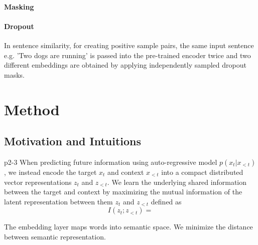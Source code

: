 \documentclass[a4paper]{article}
\begin{document}
	\paragraph*{Masking}
	\paragraph*{Dropout} \cite{gao2021simcse} In sentence similarity, for creating positive sample pairs, the same input sentence e.g. 'Two dogs are running' is passed into the pre-trained encoder twice and two different embeddings are obtained by applying independently sampled dropout masks.  

	\section{Method}

	\subsection{Motivation and Intuitions}

	\cite{van2018representation}p2-3
	When predicting future information using auto-regressive model $p(x_t|x_{<t})$, we instead encode the target $x_t$ and context $x_{<t}$ into a compact distributed vector representations $z_t$ and $z_{<t}$.
	We learn the underlying shared information between the target and context by maximizing the mutual information of the latent representation between them $z_t$ and $z_{<t}$ defined as
	\begin{equation}
		I(z_t; z_{<t}) = 
	\end{equation}

	The embedding layer maps words into semantic space. We minimize the distance between semantic representation.


	
		
\end{document}
